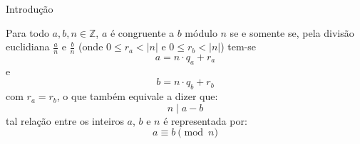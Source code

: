 \begin{frame}{Introdução}
    \begin{definicao}
        Para todo $a, b, n \in \mathbb{Z}$, $a$ é congruente a $b$ módulo $n$ se e somente se, pela divisão euclidiana $\frac{a}{n}$ e $\frac{b}{n}$ (onde $0 \leq r_{a} < |n|$ e $0 \leq r_b < |n|$) tem-se
        \begin{equation*}
            a = n \cdot q_a + r_a
        \end{equation*}
        e
        \begin{equation*}
            b = n \cdot q_b + r_b
        \end{equation*}
        com $r_a = r_b$, o que também equivale a dizer que:
        \begin{equation*}
            n \mid a - b
        \end{equation*}
        tal relação entre os inteiros $a$, $b$ e $n$ é representada por:
        \begin{equation*}
            a \equiv b \pmod{n}
        \end{equation*}
    \end{definicao}
\end{frame}


